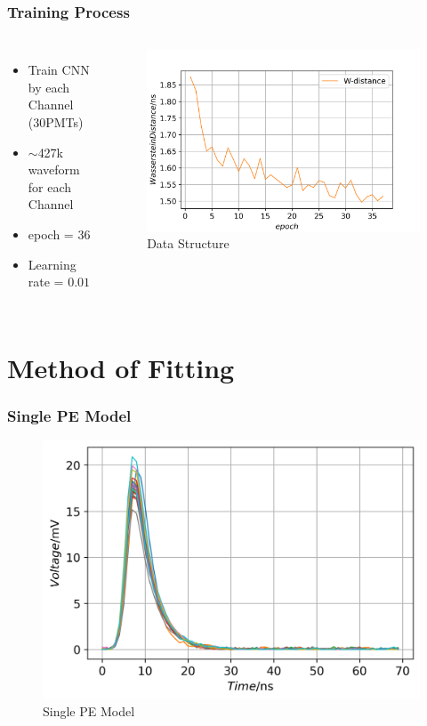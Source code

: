 \documentclass{beamer}
\begin{document}
\begin{frame}
\frametitle{Training Process}
\begin{columns}
\begin{itemize}
    \item Train CNN by each Channel (30PMTs)
    \item $\sim$427k waveform for each Channel
    \item epoch = 36
    \item Learning rate = $0.01$
\end{itemize}
\begin{figure}
    \centering
    \caption{Data Structure}
    \includegraphics[width=1.0\linewidth]{img/epoch.png}
\end{figure}
\end{columns}
\end{frame}

\section{Method of Fitting}

\begin{frame}
\frametitle{Single PE Model}
\begin{figure}
    \centering
    \caption{Single PE Model}
    \includegraphics[width=0.9\linewidth]{img/spe.png}
\end{figure}
\end{frame}
\end{document}
